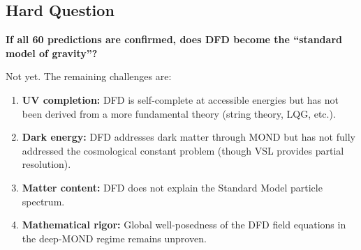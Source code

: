 \documentclass[11pt,a4paper]{article}
\begin{document}
\subsection{Hard Question}

\textbf{If all 60 predictions are confirmed, does DFD become the ``standard model of gravity''?}

Not yet. The remaining challenges are:
\begin{enumerate}
\item \textbf{UV completion:} DFD is self-complete at accessible energies but has not been derived from a more fundamental theory (string theory, LQG, etc.).
\item \textbf{Dark energy:} DFD addresses dark matter through MOND but has not fully addressed the cosmological constant problem (though VSL provides partial resolution).
\item \textbf{Matter content:} DFD does not explain the Standard Model particle spectrum.
\item \textbf{Mathematical rigor:} Global well-posedness of the DFD field equations in the deep-MOND regime remains unproven.
\end{enumerate}
\end{document}
